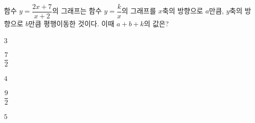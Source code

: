 \hspace*{2mm}\begin{minipage}[t]{\dimexpr\linewidth-2mm\relax}\vspace{0pt}
함수 $y=\dfrac{2x+7}{x+2}$의 그래프는 함수 $y=\dfrac{k}{x}$의 그래프를 $x$축의 방향으로 $a$만큼, $y$축의 방향으로 $b$만큼 평행이동한 것이다. 이때 $a+b+k$의 값은? 
\begin{choices32}{\rule[-3ex]{0pt}{8ex}$3$}{\rule[-3ex]{0pt}{8ex}$\dfrac{7}{2}$}{\rule[-3ex]{0pt}{8ex}$4$}{\rule[-3ex]{0pt}{8ex}$\dfrac{9}{2}$}{\rule[-3ex]{0pt}{8ex}$5$}\end{choices32}\end{minipage}
